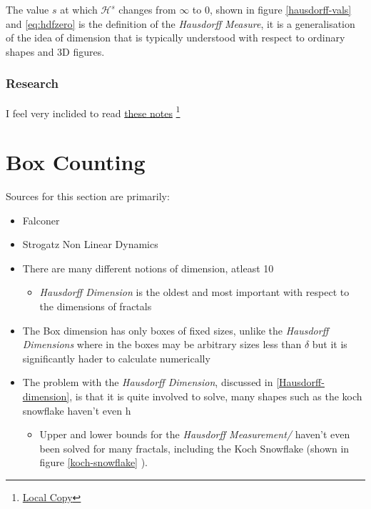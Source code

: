 \documentclass[11pt]{article}
\begin{document}
The value \(s\) at which \(\mathcal{H}^{s}\) changes from \(\infty\) to 0, shown in figure \ref{hausdorff-vals}  and \eqref{eq:hdfzero} is the definition of the \emph{Hausdorff Measure}, it is a generalisation of the idea of dimension that is typically understood with respect to ordinary shapes and 3D figures.
\subsubsection{Research}
\label{sec:org5f3f437}
I feel very inclided to read \href{https://warwick.ac.uk/fac/sci/maths/people/staff/mark\_pollicott/p3/tehran.pdf}{these notes} \footnote{\href{file:///home/ryan/Dropbox/Studies/2020Spring/QuantProject/Current/Python-Quant/Resources/Uncorrected-Warwick-BoxCount-Hausendorff-Notes.pdf}{Local Copy}}

\section{Box Counting}
\label{sec:orgae09177}
Sources for this section are primarily:
\begin{itemize}
\item Falconer \cite[Ch. 3.1]{falconerFractalGeometryMathematical2003b}
\item Strogatz Non Linear Dynamics \cite[Ch. 11.4]{strogatzNonlinearDynamicsChaos2015}

\item There are many different notions of dimension, atleast 10 \cite[Ch. 4.3]{edgarMeasureTopologyFractal2008}
\begin{itemize}
\item \emph{Hausdorff Dimension} is the oldest and most important with respect to the dimensions of fractals \cite[p. 27]{falconerFractalGeometryMathematical2003b}
\end{itemize}
\item The Box dimension has only boxes of fixed sizes, unlike the \emph{Hausdorff
Dimensions} where in the boxes may be arbitrary sizes less than \(\delta\) but
it is significantly hader to calculate numerically \cite[]{strogatzNonlinearDynamicsChaos2015}
\item The problem with the \emph{Hausdorff Dimension}, discussed in \textsection \ref{Hausdorff-dimension}, is that it is quite involved to solve, many shapes such as the koch snowflake haven't even h
\begin{itemize}
\item Upper and lower bounds for the \emph{Hausdorff Measurement/} haven't even been solved for many fractals, including the Koch Snowflake (shown in figure \ref{koch-snowflake} ). \cite{zhuLowerBoundHausdorffMeasure2003}
\end{itemize}
\end{itemize}
\end{document}
